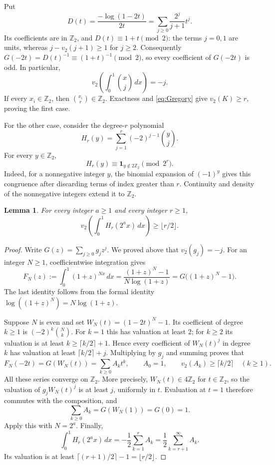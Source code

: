 \documentclass[11pt]{article}
\newtheorem{lemma}[theorem]{Lemma}
\newcommand{\vii}{v_2}
\newcommand{\Zii}{\mathbb Z_2}
\begin{document}
Put
\[
 D(t)=\frac{-\log(1-2t)}{2t}
     =\sum_{j\geq0}\frac{2^j}{j+1}t^j.
\]
Its coefficients are in $\Zii$, and $D(t)\equiv1+t\pmod2$: the terms
$j=0,1$ are units, whereas $j-\vii(j+1)\geq1$ for $j\geq2$.
Consequently $G(-2t)=D(t)^{-1}\equiv(1+t)^{-1}\pmod2$, so every
coefficient of $G(-2t)$ is odd. In particular,
\begin{equation}\label{eq:Gregory}
 \vii\left(\int_0^1\binom{x}{j}\,dx\right)=-j.
\end{equation}
If every $x_i\in\Zii$, then $\binom{x_i}{r}\in\Zii$.
Exactness and \eqref{eq:Gregory} give $\vii(K)\geq r$, proving the first case.

For the other case, consider the degree-$r$ polynomial
\[
 H_r(y)=\sum_{j=1}^r(-2)^{j-1}\binom{y}{j}.
\]
For every $y\in\Zii$,
\begin{equation}\label{eq:parity}
 H_r(y)\equiv\boldsymbol1_{y\notin2\Zii}\pmod{2^r}.
\end{equation}
Indeed, for a nonnegative integer $y$, the binomial expansion of $(-1)^y$
gives this congruence after discarding terms of index greater than $r$.
Continuity and density of the nonnegative integers extend it to $\Zii$.

\begin{lemma}\label{lem:integral}
For every integer $a\geq1$ and every integer $r\geq1$,
\[
 \vii\left(\int_0^1H_r(2^a x)\,dx\right)\geq\lfloor r/2\rfloor.
\]
\end{lemma}
\begin{proof}
Write $G(z)=\sum_{j\geq0}g_jz^j$. We proved above that
$\vii(g_j)=-j$. For an integer $N\geq1$, coefficientwise integration gives
\[
 F_N(z):=\int_0^1(1+z)^{Nx}\,dx
   =\frac{(1+z)^N-1}{N\log(1+z)}
   =G\bigl((1+z)^N-1\bigr).
\]
The last identity follows from the formal identity
$\log((1+z)^N)=N\log(1+z)$.

Suppose $N$ is even and set $W_N(t)=(1-2t)^N-1$.
Its coefficient of degree $k\geq1$ is $(-2)^k\binom Nk$.
For $k=1$ this has valuation at least $2$; for $k\geq2$ its valuation
is at least $k\geq\lceil k/2\rceil+1$. Hence every coefficient of
$W_N(t)^j$ in degree $k$ has valuation at least $\lceil k/2\rceil+j$.
Multiplying by $g_j$ and summing proves that
\[
 F_N(-2t)=G(W_N(t))=\sum_{k\geq0} A_k t^k,
 \qquad A_0=1,\qquad \vii(A_k)\geq\lceil k/2\rceil\quad(k\geq1).
\]
All these series converge on $\Zii$. More precisely,
$W_N(t)\in4\Zii$ for $t\in\Zii$, so the valuation of
$g_jW_N(t)^j$ is at least $j$, uniformly in $t$. Evaluation at $t=1$
therefore commutes with the composition, and
\[
 \sum_{k\geq0}A_k=G(W_N(1))=G(0)=1.
\]
Apply this with $N=2^a$.
Finally,
\[
 \int_0^1 H_r(2^a x)\,dx
  =-\frac12\sum_{k=1}^r A_k
  =\frac12\sum_{k=r+1}^\infty A_k.
\]
Its valuation is at least $\lceil(r+1)/2\rceil-1=\lfloor r/2\rfloor$.
\end{proof}
\end{document}
